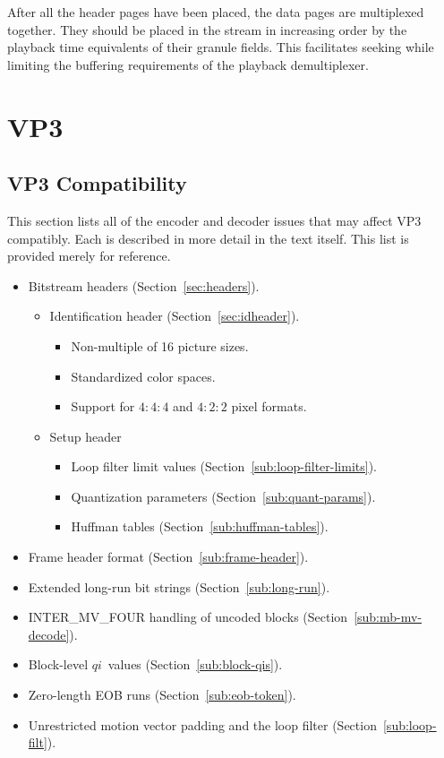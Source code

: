 \documentclass[9pt,letterpaper]{book}
\newcommand{\idx}[1]{{\ensuremath{\mathit{#1}}}}
\newcommand{\qi}{\idx{qi}}
\numberwithin{equation}{chapter}
\numberwithin{figure}{chapter}
\numberwithin{table}{chapter}
\begin{document}
After all the header pages have been placed,
 the data pages are multiplexed together.
They should be placed in the stream in increasing order by the playback
 time equivalents of their granule fields.
This facilitates seeking while limiting the buffering requirements of the
 playback demultiplexer.

\cleardoublepage
\chapter{VP3}

\section{VP3 Compatibility}
\label{app:vp3-compat}
This section lists all of the encoder and decoder issues that may affect VP3
 compatibly.
Each is described in more detail in the text itself.
This list is provided merely for reference.

\begin{itemize}
\item
Bitstream headers (Section~\ref{sec:headers}).
\begin{itemize}
\item
Identification header (Section~\ref{sec:idheader}).
\begin{itemize}
\item
Non-multiple of 16 picture sizes.
\item
Standardized color spaces.
\item
Support for $4:4:4$ and $4:2:2$ pixel formats.
\end{itemize}
\item
Setup header
\begin{itemize}
\item
Loop filter limit values (Section~\ref{sub:loop-filter-limits}).
\item
Quantization parameters (Section~\ref{sub:quant-params}).
\item
Huffman tables (Section~\ref{sub:huffman-tables}).
\end{itemize}
\end{itemize}
\item
Frame header format (Section~\ref{sub:frame-header}).
\item
Extended long-run bit strings (Section~\ref{sub:long-run}).
\item
INTER\_MV\_FOUR handling of uncoded blocks (Section~\ref{sub:mb-mv-decode}).
\item
Block-level \qi\ values (Section~\ref{sub:block-qis}).
\item
Zero-length EOB runs (Section~\ref{sub:eob-token}).
\item
Unrestricted motion vector padding and the loop filter
 (Section~\ref{sub:loop-filt}).
\end{itemize}
\end{document}
